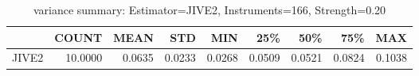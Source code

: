 \begin{table}[ht]
\centering
\caption{variance summary: Estimator=JIVE2, Instruments=166, Strength=0.20}
\begin{tabular}{lrrrrrrrr}
\toprule
 & COUNT & MEAN & STD & MIN & 25\% & 50\% & 75\% & MAX \\
\midrule
JIVE2 & 10.0000 & 0.0635 & 0.0233 & 0.0268 & 0.0509 & 0.0521 & 0.0824 & 0.1038 \\
\bottomrule
\end{tabular}
\end{table}
